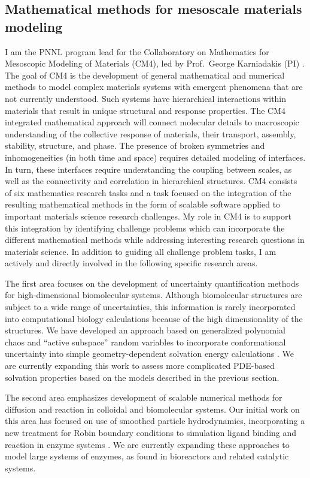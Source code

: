\documentclass[11pt]{amsart}
\begin{document}
\subsection{Mathematical methods for mesoscale materials modeling}
I am the PNNL program lead for the  Collaboratory on Mathematics for Mesoscopic Modeling of Materials (CM4), led by Prof.\ George Karniadakis (PI) \cite{CM4}.
The goal of CM4 is the development of general mathematical and numerical methods to model complex materials systems with emergent phenomena that are not currently understood.
Such systems have hierarchical interactions within materials that result in unique structural and response properties.
The CM4 integrated mathematical approach will connect molecular details to macroscopic understanding of the collective response of materials, their transport, assembly, stability, structure, and phase.
The presence of broken symmetries and inhomogeneities (in both time and space) requires detailed modeling of interfaces.
In turn, these interfaces require understanding the coupling between scales, as well as the connectivity and correlation in hierarchical structures.
CM4 consists of six mathematics research tasks and a task focused on the integration of the resulting mathematical methods in the form of scalable software applied to important materials science research challenges.  
My role in CM4 is to support this integration by identifying challenge problems which can incorporate the different mathematical methods while addressing interesting research questions in materials science.  
In addition to guiding all challenge problem tasks, I am actively and directly involved in the following specific research areas.

The first area focuses on the development of uncertainty quantification methods for high-dimen\-sional bio\-molecular systems.
Although biomolecular structures are subject to a wide range of uncertainties, this information is rarely incorporated into computational biology calculations because of the high dimensionality of the structures.
We have developed an approach based on generalized polynomial chaos and ``active subspace'' random variables to incorporate conformational uncertainty into simple geometry-dependent solvation energy calculations \cite{Lei2014}. 
We are currently expanding this work to assess more complicated PDE-based solvation properties based on the models described in the previous section.

The second area emphasizes development of scalable numerical methods for diffusion and reaction in colloidal and biomolecular systems.
Our initial work on this area has focused on use of smoothed particle hydrodynamics, incorporating a new treatment for Robin boundary conditions to simulation ligand binding and reaction in enzyme systems \cite{Pan2015}.
We are currently expanding these approaches to model large systems of enzymes, as found in bioreactors and related catalytic systems.
\end{document}
